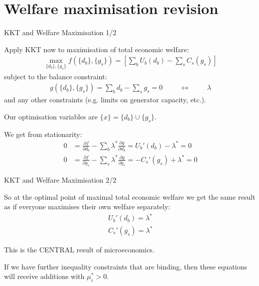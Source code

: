 \documentclass[10pt,dvipsnames]{beamer}
\def\l{\lambda}
\def\m{\mu}
\def\d{\partial}
\begin{document}
\section{Welfare maximisation revision}


\begin{frame}{KKT and Welfare Maximisation 1/2}

  Apply KKT now to maximisation of total economic welfare:
  \begin{align*}
    \max_{\{d_b\}, \{g_s\}} f(\{d_b\}, \{g_s\}) = \left[ \sum_b U_b (d_b)  -  \sum_s C_s (g_s) \right]
  \end{align*}
  subject to the balance constraint:
  \begin{align*}
    g(\{d_b\}, \{g_s\}) = \sum_b d_b -  \sum_s g_s  = 0 \hspace{1cm} \leftrightarrow \hspace{1cm} \l
  \end{align*}
  and any other constraints (e.g. limits on generator capacity, etc.).

  Our optimisation variables are $\{x\} = \{d_b\} \cup \{g_s\}$.

  We get from stationarity:
  \begin{align*}
    0 & =   \frac{\d f}{\d d_b} - \sum_b \l^* \frac{\d g}{\d d_b} = U_b'(d_b) - \l^* = 0 \\
    0 & =   \frac{\d f}{\d g_s} - \sum_s \l^* \frac{\d g}{\d g_s} = -C_s'(g_s) + \l^* = 0
  \end{align*}


\end{frame}





\begin{frame}{KKT and Welfare Maximisation 2/2}

  So at the optimal point of maximal total economic welfare we get the
  same result as if everyone maximises their own welfare separately:
  \begin{align*}
 U_b'(d_b) =  \l^*  \\
 C_s'(g_s) = \l^*
  \end{align*}

  This is the CENTRAL result of microeconomics.

  If we have further inequality constraints that are binding, then
  these equations will receive additions with $\m_i^* > 0$.


\end{frame}
\end{document}
